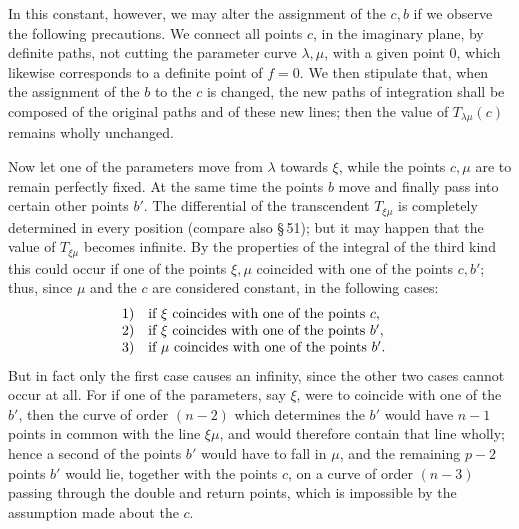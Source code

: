 \documentclass[10pt]{article}
\begin{document}
In this constant, however, we may alter the assignment of the \(c,b\) if we observe the following precautions. We connect all points \(c\), in the imaginary plane, by definite paths, not cutting the parameter curve \(\lambda,\mu\), with a given point \(0\), which likewise corresponds to a definite point of \(f=0\). We then stipulate that, when the assignment of the \(b\) to the \(c\) is changed, the new paths of integration shall be composed of the original paths and of these new lines; then the value of \(T_{\lambda\mu}(c)\) remains wholly unchanged.

Now let one of the parameters move from \(\lambda\) towards \(\xi\), while the points \(c,\mu\) are to remain perfectly fixed. At the same time the points \(b\) move and finally pass into certain other points \(b'\). The differential of the transcendent \(T_{\xi\mu}\) is completely determined in every position (compare also \S\,51); but it may happen that the value of \(T_{\xi\mu}\) becomes infinite. By the properties of the integral of the third kind this could occur if one of the points \(\xi,\mu\) coincided with one of the points \(c,b'\); thus, since \(\mu\) and the \(c\) are considered constant, in the following cases:
\[
\begin{array}{ll}
1) & \text{if }\xi\text{ coincides with one of the points }c,\quad\hfill\\
2) & \text{if }\xi\text{ coincides with one of the points }b',\quad\hfill\\
3) & \text{if }\mu\text{ coincides with one of the points }b'.
\end{array}
\]
But in fact only the first case causes an infinity, since the other two cases cannot occur at all. For if one of the parameters, say \(\xi\), were to coincide with one of the \(b'\), then the curve of order \((n-2)\) which determines the \(b'\) would have \(n-1\) points in common with the line \(\xi\mu\), and would therefore contain that line wholly; hence a second of the points \(b'\) would have to fall in \(\mu\), and the remaining \(p-2\) points \(b'\) would lie, together with the points \(c\), on a curve of order \((n-3)\) passing through the double and return points, which is impossible by the assumption made about the \(c\).
\end{document}
